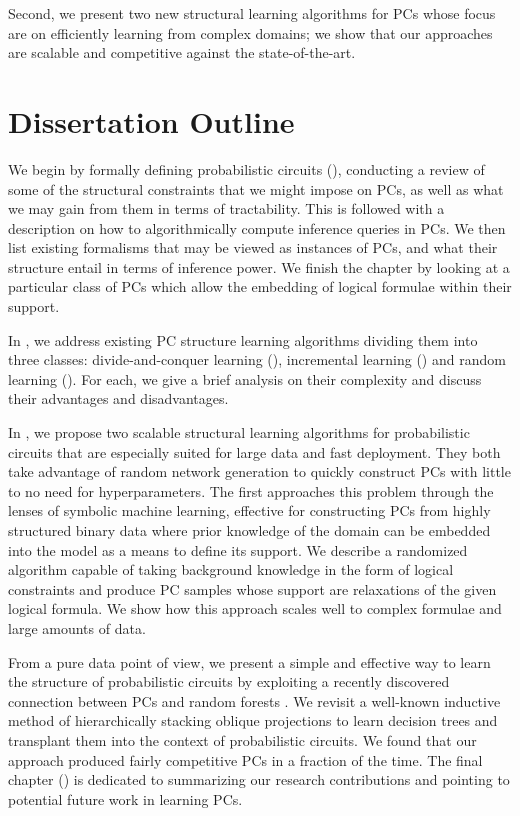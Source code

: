 Second, we present two new structural learning algorithms for PCs whose focus are on efficiently
learning from complex domains; we show that our approaches are scalable and competitive against the
state-of-the-art.

\section{Dissertation Outline}

We begin  by formally defining probabilistic circuits (), conducting a
review of some of the structural constraints that we might impose on PCs, as well as what we may
gain from them in terms of tractability. This is followed with a description on how to
algorithmically compute inference queries in PCs. We then list existing formalisms that may be
viewed as instances of PCs, and what their structure entail in terms of inference power. We finish
the chapter by looking at a particular class of PCs which allow the embedding of logical formulae
within their support.

In , we address existing PC structure learning algorithms dividing them into
three classes: divide-and-conquer learning (), incremental learning
() and random learning (). For each, we give a brief
analysis on their complexity and discuss their advantages and disadvantages.

In , we propose two scalable structural learning algorithms for probabilistic
circuits that are especially suited for large data and fast deployment. They both take advantage of
random network generation to quickly construct PCs with little to no need for hyperparameters. The
first approaches this problem through the lenses of symbolic machine learning, effective for
constructing PCs from highly structured binary data where prior knowledge of the domain can be
embedded into the model as a means to define its support. We describe a randomized algorithm
capable of taking background knowledge in the form of logical constraints and produce PC samples
whose support are relaxations of the given logical formula. We show how this approach scales well
to complex formulae and large amounts of data.

From a pure data point of view, we present a simple and effective way to learn the structure of
probabilistic circuits by exploiting a recently discovered connection between PCs and random
forests \citep{correia20}. We revisit a well-known inductive method of hierarchically stacking
oblique projections to learn decision trees \citep{dasgupta08a,dasgupta08b} and transplant them
into the context of probabilistic circuits. We found that our approach produced fairly competitive
PCs in a fraction of the time. The final chapter () is dedicated to summarizing
our research contributions and pointing to potential future work in learning PCs.

